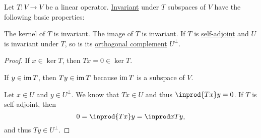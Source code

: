 \begin{proposition}\label{thm:invariant_subspace}
  Let \( T: V \to V \) be a linear operator. \hyperref[def:invariant_subset]{Invariant} under \( T \) subspaces of \( V \) have the following basic properties:
  \begin{thmenum}
     The kernel of \( T \) is invariant.
     The image of \( T \) is invariant.
     If \( T \) is \hyperref[def:adjoint_operator]{self-adjoint} and \( U \) is invariant under \( T \), so is its \hyperref[def:orthogonal_complement]{orthogonal complement} \( U^\perp \).
  \end{thmenum}
\end{proposition}
\begin{proof}
   If \( x \in \ker T \), then \( Tx = 0 \in \ker T \).

   If \( y \in \operatorname{im} T \), then \( Ty \in \operatorname{im} T \) because \( \operatorname{im} T \) is a subspace of \( V \).

   Let \( x \in U \) and \( y \in U^\perp \). We know that \( Tx \in U \) and thus \( \inprod {Tx} y = 0 \). If \( T \) is self-adjoint, then
  \begin{equation*}
    0 = \inprod {Tx} y = \inprod x {Ty},
  \end{equation*}
  and thus \( Ty \in U^\perp \).
\end{proof}

